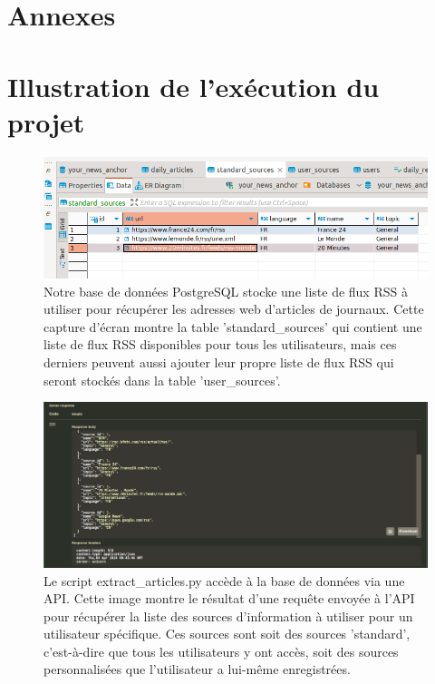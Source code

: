 \documentclass[french]{article}
\begin{document}
    \appendix
    \newpage
    \section*{Annexes \huge \centering}
    \section*{Illustration de l'exécution du projet}
    \hypertarget{screenshots_processus}{}
    \begin{figure}[h!]
        \includegraphics[width=12cm]{db_1}
        \centering
        \caption{Notre base de données PostgreSQL stocke une liste de flux RSS à utiliser pour récupérer les adresses web d'articles de journaux. Cette capture d'écran montre la table 'standard\_sources' qui contient une liste de flux RSS disponibles pour tous les utilisateurs, mais ces derniers peuvent aussi ajouter leur propre liste de flux RSS qui seront stockés dans la table 'user\_sources'.}
        \centering
    \end{figure}
    \begin{figure}[h!]
        \includegraphics[width=12cm]{api_1}
        \centering
        \caption{Le script extract\_articles.py accède à la base de données via une API. Cette image montre le résultat d'une requête envoyée à l'API pour récupérer la liste des sources d'information à utiliser pour un utilisateur spécifique. Ces sources sont soit des sources 'standard', c'est-à-dire que tous les utilisateurs y ont accès, soit des sources personnalisées que l'utilisateur a lui-même enregistrées.}
        \centering
    \end{figure}
\end{document}
